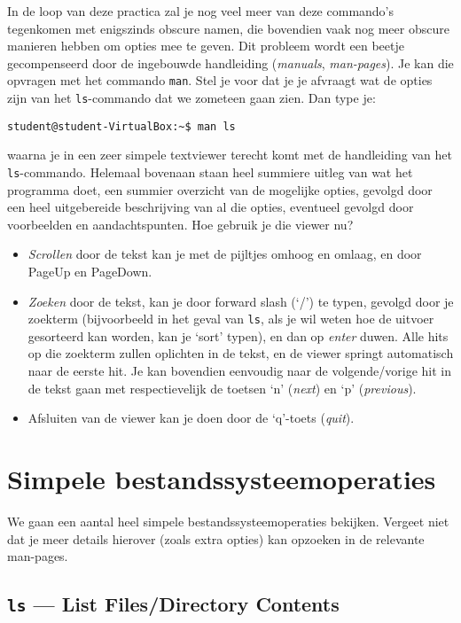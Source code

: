 \documentclass[a4paper,twoside,openany]{memoir}
\begin{document}
In de loop van deze practica zal je nog veel meer van deze commando's tegenkomen met enigszinds obscure namen, die bovendien vaak nog meer obscure manieren hebben om opties mee te geven. Dit probleem wordt een beetje gecompenseerd door de ingebouwde handleiding (\emph{manuals}, \emph{man-pages}). Je kan die opvragen met het commando \verb!man!. Stel je voor dat je je afvraagt wat de opties zijn van het \verb!ls!-commando dat we zometeen gaan zien. Dan type je:
\begin{verbatim}
student@student-VirtualBox:~$ man ls
\end{verbatim}
waarna je in een zeer simpele textviewer terecht komt met de handleiding van het \verb!ls!-commando. Helemaal bovenaan staan heel summiere uitleg van wat het programma doet, een summier overzicht van de mogelijke opties, gevolgd door een heel uitgebereide beschrijving van al die opties, eventueel gevolgd door voorbeelden en aandachtspunten. Hoe gebruik je die viewer nu?
\begin{itemize}
\item \emph{Scrollen} door de tekst kan je met de pijltjes omhoog en omlaag, en door PageUp en PageDown.
\item \emph{Zoeken} door de tekst, kan je door forward slash (`/') te typen, gevolgd door je zoekterm (bijvoorbeeld in het geval van \verb!ls!, als je wil weten hoe de uitvoer gesorteerd kan worden, kan je `sort' typen), en dan op \emph{enter} duwen. Alle hits op die zoekterm zullen oplichten in de tekst, en de viewer springt automatisch naar de eerste hit. Je kan bovendien eenvoudig naar de volgende/vorige hit in de tekst gaan met respectievelijk de toetsen `n' (\emph{next}) en `p' (\emph{previous}).
\item {Afsluiten} van de viewer kan je doen door de `q'-toets (\emph{quit}).
\end{itemize}

\chapter{Simpele bestandssysteemoperaties}

We gaan een aantal heel simpele bestandssysteemoperaties bekijken. Vergeet niet dat je meer details hierover (zoals extra opties) kan opzoeken in de relevante man-pages.

\section{\texttt{ls} --- List Files/Directory Contents}
\end{document}
